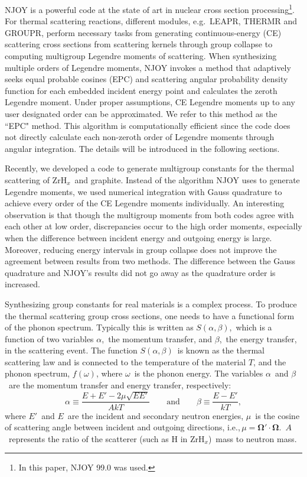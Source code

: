 \documentclass[review]{elsarticle}
\newcommand{\zh}{ZrH$_x$}
\newcommand{\law}{S(\alpha,\beta)}
\begin{document}
NJOY is a powerful code at the state of art in nuclear cross section processing\footnote{In this paper, NJOY 99.0 was used.}. For thermal scattering reactions, different modules, e.g.~LEAPR, THERMR and GROUPR, perform necessary tasks from generating continuous-energy (CE) scattering cross sections from scattering kernels through group collapse to computing multigroup Legendre moments of scattering\cite{NJOY}. When synthesizing multiple orders of Legendre moments, NJOY invokes a method that adaptively seeks equal probable cosines (EPC) and scattering angular probability density function for each embedded incident energy point and calculates the zeroth Legendre moment\cite{NJOY,Macf}. Under proper assumptions, CE Legendre moments up to any user designated order can be  approximated. We refer to this method as the ``EPC" method. This algorithm is computationally efficient since the code does not directly calculate each non-zeroth order of Legendre moments through angular integration. The details will be introduced in the following sections.

Recently, we developed a code to generate multigroup constants for the thermal scattering of \zh~and graphite. Instead of the algorithm NJOY uses to generate Legendre moments, we used numerical integration with Gauss quadrature to achieve every order of the CE Legendre moments individually. 
An interesting observation is that though the multigroup moments from both codes agree with each other at low order, discrepancies occur to the high order moments, especially when the difference between incident energy and outgoing energy is large. Moreover, reducing energy intervals in group collapse does not improve the agreement between results from two methods. The difference between the Gauss quadrature and NJOY's results did not go away as the quadrature order is increased.

Synthesizing group constants for real materials is a complex process. To produce the thermal scattering group cross sections, one needs to have a functional form of the phonon spectrum. Typically this is written as $\law$,~which is a function of two variables $\alpha$,~the momentum transfer, and $\beta$,~the energy transfer, in the scattering event. The function $\law$~is known as the thermal scattering law and is connected to the temperature of the material $T$, and the phonon spectrum,
$f(\omega)$, where $\omega$~is the phonon energy. The variables $\alpha$~and $\beta$~are the momentum transfer and energy transfer, respectively:
\begin{equation}
\alpha\equiv\frac{E+E'-2\mu\sqrt{EE'}}{AkT}\qquad\mathrm{and}\qquad\beta\equiv\frac{E-E'}{kT},
\end{equation}
where $E'$~and $E$~are the incident and secondary neutron energies, $\mu$~is the cosine of scattering angle between incident and outgoing directions, i.e.,\,$\mu=\mathbf{\Omega'\cdot\Omega}$.\ $A$~represents the ratio of the scatterer (such as H in \zh)~mass to neutron mass. 
\end{document}
